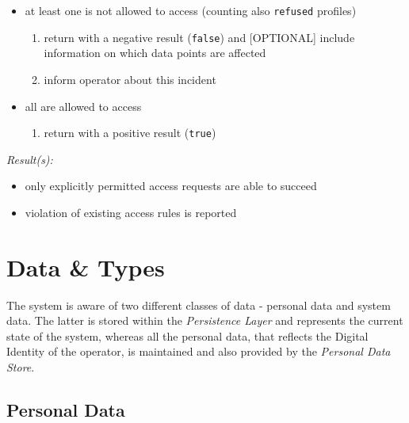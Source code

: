 \documentclass[12pt,english,a4paper,titlepage,cleardoublepage=empty,dottedtoc]{report}
\providecommand{\tightlist}{%
  \setlength{\itemsep}{0pt}\setlength{\parskip}{0pt}}
\begin{document}
\begin{enumerate}
\begin{itemize}
    \begin{itemize}
    \tightlist
    \item
      at least one is not allowed to access (counting also
      \texttt{refused} profiles)

      \begin{enumerate}
      \def\labelenumii{\arabic{enumii})}
      \tightlist
      \item
        return with a negative result (\texttt{false}) and
        {[}OPTIONAL{]} include information on which data points are
        affected
      \item
        inform operator about this incident
      \end{enumerate}
    \item
      all are allowed to access

      \begin{enumerate}
      \def\labelenumii{\arabic{enumii})}
      \tightlist
      \item
        return with a positive result (\texttt{true})
      \end{enumerate}
    \end{itemize}
  \end{itemize}
\end{enumerate}

\emph{Result(s):}

\begin{itemize}
\tightlist
\item
  only explicitly permitted access requests are able to succeed
\item
  violation of existing access rules is reported
\end{itemize}

\section{Data \& Types}\label{data-types}

The system is aware of two different classes of data - personal data and
system data. The latter is stored within the \emph{Persistence Layer}
and represents the current state of the system, whereas all the personal
data, that reflects the Digital Identity of the operator, is maintained
and also provided by the \emph{Personal Data Store}.

\subsection{Personal Data}\label{personal-data}
\end{document}
